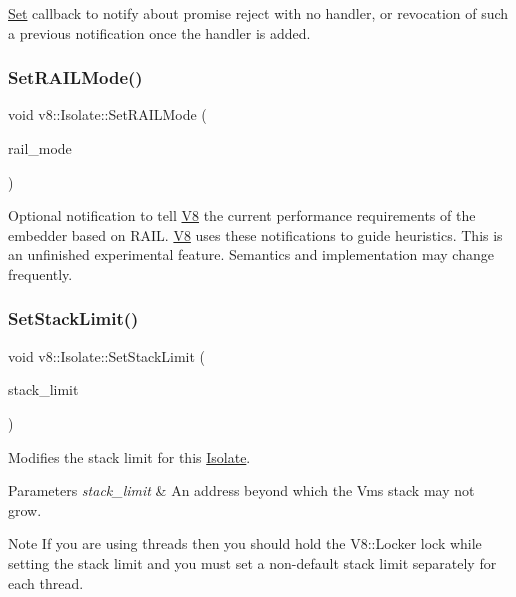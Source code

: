 \mbox{\hyperlink{classv8_1_1Set}{Set}} callback to notify about promise reject with no handler, or revocation of such a previous notification once the handler is added. \mbox{\label{classv8_1_1Isolate_a3d031d0e47d501e53f550cc16247b580}} 
\subsubsection{\texorpdfstring{Set\+R\+A\+I\+L\+Mode()}{SetRAILMode()}}
{\footnotesize\ttfamily void v8\+::\+Isolate\+::\+Set\+R\+A\+I\+L\+Mode (\begin{DoxyParamCaption}\item[{\mbox{\hyperlink{namespacev8_a317cb610383138992c7200c35f8abe5f}{R\+A\+I\+L\+Mode}}}]{rail\+\_\+mode }\end{DoxyParamCaption})}

Optional notification to tell \mbox{\hyperlink{classv8_1_1V8}{V8}} the current performance requirements of the embedder based on R\+A\+IL. \mbox{\hyperlink{classv8_1_1V8}{V8}} uses these notifications to guide heuristics. This is an unfinished experimental feature. Semantics and implementation may change frequently. \mbox{\label{classv8_1_1Isolate_addbbe14af7efb92999ac3944bc9ffed5}} 
\subsubsection{\texorpdfstring{Set\+Stack\+Limit()}{SetStackLimit()}}
{\footnotesize\ttfamily void v8\+::\+Isolate\+::\+Set\+Stack\+Limit (\begin{DoxyParamCaption}\item[{uintptr\+\_\+t}]{stack\+\_\+limit }\end{DoxyParamCaption})}

Modifies the stack limit for this \mbox{\hyperlink{classv8_1_1Isolate}{Isolate}}.


\begin{DoxyParams}{Parameters}
{\em stack\+\_\+limit} & An address beyond which the Vm\textquotesingle{}s stack may not grow.\\
\hline
\end{DoxyParams}
\begin{DoxyNote}{Note}
If you are using threads then you should hold the V8\+::\+Locker lock while setting the stack limit and you must set a non-\/default stack limit separately for each thread. 
\end{DoxyNote}
\mbox{\label{classv8_1_1Isolate_ad608b24b2c1b49a97ed4f04500976166}} 
